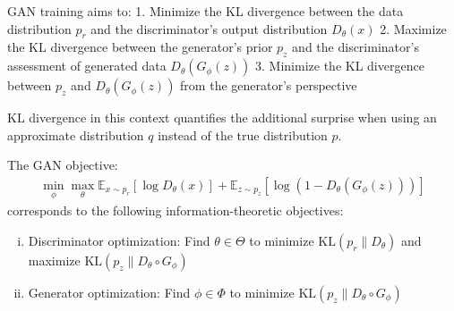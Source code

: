GAN training aims to:
1. Minimize the KL divergence between the data distribution $p_r$ and the discriminator's output distribution $D_\theta(x)$
2. Maximize the KL divergence between the generator's prior $p_z$ and the discriminator's assessment of generated data $D_\theta(G_\phi(z))$
3. Minimize the KL divergence between $p_z$ and $D_\theta(G_\phi(z))$ from the generator's perspective

\begin{remark}
  KL divergence in this context quantifies the additional surprise when using an approximate distribution $q$ instead of the true distribution $p$.
\end{remark}

\begin{proposition}%
  \label{thm:info-objective}%
  The GAN objective:
  \begin{align}
    \label{eq:gan-objective}
    \min_\phi \max_\theta \mathbb{E}_{x \sim p_r}[\log D_\theta(x)] + \mathbb{E}_{z \sim p_z}[\log(1 - D_\theta(G_\phi(z)))]
  \end{align}
  corresponds to the following information-theoretic objectives:
\begin{enumerate}[(i)]
  \item Discriminator optimization: Find $\theta \in \Theta$ to minimize $\text{KL}(p_r \| D_\theta)$ and maximize $\text{KL}(p_z \| D_\theta \circ G_\phi)$
  \item Generator optimization: Find $\phi \in \Phi$ to minimize $\text{KL}(p_z \| D_\theta \circ G_\phi)$
  \end{enumerate}
\end{proposition}

